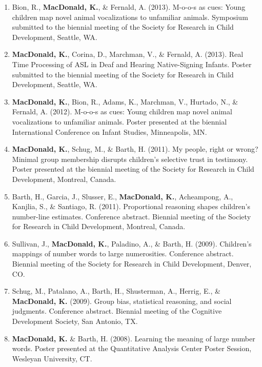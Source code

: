 \documentclass[10pt]{article}
\makeatletter
\newlength{\bibhang}
\newlength{\bibsep}
 {\@listi \global\bibsep\itemsep \global\advance\bibsep by\parsep}
\newenvironment{bibsection}%
        {\begin{enumerate}{}{%
       \setlength{\leftmargin}{\bibhang}%
       \setlength{\itemindent}{-\leftmargin}%
       \setlength{\itemsep}{\bibsep}%
       \setlength{\parsep}{\z@}%
        \setlength{\partopsep}{0pt}%
        \setlength{\topsep}{0pt}}}
        {\end{enumerate}\vspace{-.6\baselineskip}}
\makeatother
\begin{document}
\begin{bibsection}
\item Bion, R., {\bf MacDonald, K.}, \& Fernald, A. (2013). M-o-o-s as cues: Young children map novel animal vocalizations to unfamiliar animals. Symposium submitted to the biennial meeting of the Society for Research in Child Development, Seattle, WA.  

\item {\bf MacDonald, K.}, Corina, D., Marchman, V., \& Fernald, A. (2013). Real Time Processing of ASL in Deaf and Hearing Native-Signing Infants. Poster submitted to the biennial meeting of the Society for Research in Child Development, Seattle, WA.

\item {\bf MacDonald, K.}, Bion, R., Adams, K., Marchman, V., Hurtado, N., \& Fernald, A. (2012).   M-o-o-s as cues: Young children map novel animal vocalizations to unfamiliar animals. Poster presented at the biennial International Conference on Infant Studies, Minneapolis, MN.

\item {\bf MacDonald, K.}, Schug, M., \& Barth, H. (2011). My people, right or wrong? Minimal group membership disrupts children's selective trust in testimony. Poster presented at the biennial meeting of the Society for Research in Child Development, Montreal, Canada.

\item Barth, H., Garcia, J., Slusser, E., {\bf MacDonald, K.}, Acheampong, A., Kanjlia, S., \& Santiago, R. (2011). Proportional reasoning shapes children's number-line estimates. Conference abstract. Biennial meeting of the Society for Research in Child Development, Montreal, Canada.

\item Sullivan, J., {\bf MacDonald, K.}, Paladino, A., \& Barth, H. (2009). Children's mappings of number words to large numerosities. Conference abstract. Biennial meeting of the Society for Research in Child Development, Denver, CO.

\item Schug, M., Patalano, A., Barth, H., Shusterman, A., Herrig, E., \& {\bf MacDonald, K.} (2009). Group bias, statistical reasoning, and social judgments. Conference abstract. Biennial meeting of the Cognitive Development Society, San Antonio, TX.

\item {\bf MacDonald, K.} \& Barth, H. (2008). Learning the meaning of large number words. Poster presented at the Quantitative Analysis Center Poster Session, Wesleyan University, CT.

\end{bibsection}
\end{document}
